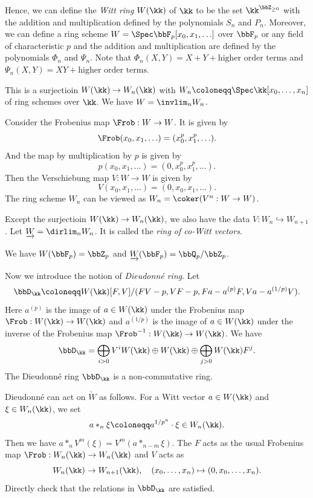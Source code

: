 Hence, we can define the \emph{Witt ring} $W(\kk)$ of $\kk$ to be the set $\kk^{\bbZ_{\ge 0}}$ with the addition and multiplication defined by the polynomials $S_n$ and $P_n$.
Moreover, we can define a ring scheme $W = \Spec \bbF_p[x_0, x_1, \ldots]$ over $\bbF_p$ or any field of characteristic $p$ and the addition and multiplication are defined by the polynomials $\Phi_n$ and $\Psi_n$.
Note that $\Phi_n(X,Y) = X + Y + \text{higher order terms}$ and $\Psi_n(X,Y) = XY + \text{higher order terms}$.

This is a surjectioin $W(\kk) \to W_n(\kk)$ with $W_n \coloneqq \Spec \kk[x_0, \ldots, x_{n}]$ of ring schemes over $\kk$.
We have $W = \invlim_n W_n$.

Consider the Frobenius map $\Frob: W \to W$.
It is given by
\[ \Frob(x_0, x_1, \ldots) = (x_0^p, x_1^p, \ldots). \]
And the map by multiplication by $p$ is given by
\[ p(x_0, x_1, \ldots) = (0, x_0^p, x_1^p, \ldots). \]
Then the Verschiebung map $V: W \to W$ is given by
\[ V(x_0, x_1, \ldots) = (0, x_0, x_1, \ldots). \]
The ring scheme $W_n$ can be viewed as $W_n = \coker(V^n: W \to W)$.

Except the surjectioin $W(\kk) \to W_n(\kk)$, we also have the data $V: W_n \hookrightarrow W_{n+1}$.
Let $\underrightarrow{W} = \dirlim_n W_n$.
It is called the \emph{ring of co-Witt vectors}.

\begin{example}
	We have $W(\bbF_p) = \bbZ_p$ and $\underrightarrow{W}(\bbF_p) = \bbQ_p/\bbZ_p$.
\end{example}

Now we introduce the notion of \emph{Dieudonné ring}.
Let
\[ \bbD_\kk \coloneqq W(\kk)[F,V] / (FV - p, VF - p, F a - a^{(p)} F, V a - a^{(1/ p)} V). \]
Here $a^{(p)}$ is the image of $a \in W(\kk)$ under the Frobenius map $\Frob: W(\kk) \to W(\kk)$ and $a^{(1/p)}$ is the image of $a \in W(\kk)$ under the inverse of the Frobenius map $\Frob^{-1}: W(\kk) \to W(\kk)$.
We have
\[ \bbD_\kk = \bigoplus_{i>0} V^i W(\kk) \oplus W(\kk) \oplus \bigoplus_{j > 0} W(\kk) F^j. \]
The Dieudonné ring $\bbD_\kk$ is a non-commutative ring.

Dieudonné can act on $\underrightarrow{W}$ as follows.
For a Witt vector $a \in W(\kk)$ and $\xi \in W_n(\kk)$, we set
\[ a *_n \xi \coloneqq a^{1/p^n} \cdot \xi \in W_n(\kk). \]
Then we have $a *_n V^m(\xi) = V^{m}(a *_{n-m} \xi)$.
The $F$ acts as the usual Frobenius map $\Frob: W_n(\kk) \to W_n(\kk)$ and $V$ acts as
\[ W_n(\kk) \to W_{n+1}(\kk), \quad (x_0, \ldots, x_{n}) \mapsto (0, x_0, \ldots, x_{n}). \]
Directly check that the relations in $\bbD_\kk$ are satisfied.


